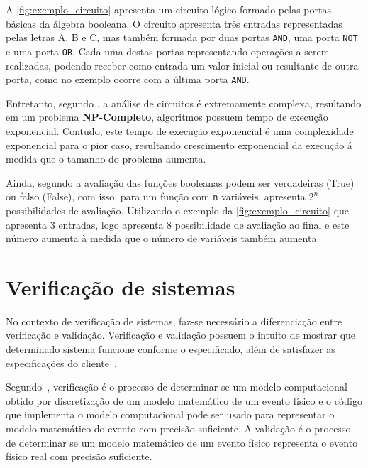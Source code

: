 A \autoref{fig:exemplo_circuito} apresenta um circuito lógico formado pelas portas básicas da álgebra booleana. O circuito apresenta três entradas representadas pelas letras A, B e C, mas também formada por duas portas \texttt{AND}, uma porta \texttt{NOT} e uma porta \texttt{OR}. Cada uma destas portas representando operações a serem realizadas, podendo receber como entrada um valor inicial ou resultante de outra porta, como no exemplo ocorre com a última porta \texttt{AND}.

\par
Entretanto, segundo , a análise de circuitos é extremamente complexa, resultando em um problema \textbf{NP-Completo}, algoritmos possuem tempo de execução exponencial. Contudo, este tempo de execução exponencial é uma complexidade exponencial para o pior caso, resultando crescimento exponencial da execução á medida que o tamanho do problema aumenta.

\par
Ainda, segundo  a avaliação das funções booleanas podem ser verdadeiras (True) ou falso (False), com isso, para um função com \texttt{n} variáveis, apresenta $2^{n}$ possibilidades de avaliação. Utilizando o exemplo da \autoref{fig:exemplo_circuito} que apresenta $3$ entradas, logo apresenta 8 possibilidade de avaliação ao final e este número aumenta à medida que o número de variáveis também aumenta.

\section{Verificação de sistemas}
 No contexto de verificação de sistemas, faz-se necessário a diferenciação entre verificação e validação. Verificação e validação possuem o intuito de mostrar que determinado sistema funcione conforme o especificado, além de satisfazer as especificações do cliente~\cite{sommerville2011engenharia}. 

\par
Segundo~, verificação é o processo de determinar se um modelo computacional obtido por discretização de um modelo matemático de um evento físico e o código que implementa o modelo computacional pode ser usado para representar o modelo matemático do evento com precisão suficiente. A validação é o processo de determinar se um modelo matemático de um evento físico representa o evento físico real com precisão suficiente.


